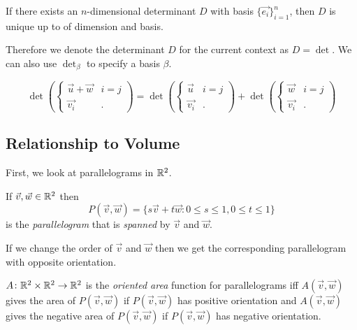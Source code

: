 \documentclass[notes.tex]{subfiles}
\begin{document}
\begin{lemma}
    If there exists an $n$-dimensional determinant $D$ with basis $\{ \vec{e_i} \}_{i = 1}^n$, then $D$ is unique up to of dimension and basis.
\end{lemma}

Therefore we denote the determinant $D$ for the current context as $D = \det$. We can also use $\det_\beta$ to specify a basis $\beta$.

\begin{theorem}
    \[
        \det\left( \begin{cases}
            \vec{u} + \vec{w} & i = j \\
            \vec{v_i} & .
        \end{cases} \right)
        =
        \det\left( \begin{cases}
            \vec{u} & i = j \\
            \vec{v_i} & .
        \end{cases} \right)
        +
        \det\left( \begin{cases}
            \vec{w} & i = j \\
            \vec{v_i} & .
        \end{cases} \right)
    \]
\end{theorem}

\subsection{Relationship to Volume}
First, we look at parallelograms in $\mathbb{R}^2$.

\begin{definition}[Parallelogram]
    If $\vec{v}, \vec{w} \in \mathbb{R}^2$ then
    \[
        P(\vec{v}, \vec{w}) = \{ s\vec{v} + t\vec{w} : 0 \leq s \leq 1, 0 \leq t \leq 1 \}
    \]
    is the \textit{parallelogram} that is \textit{spanned} by $\vec{v}$ and $\vec{w}$.
\end{definition}

If we change the order of $\vec{v}$ and $\vec{w}$ then we get the corresponding parallelogram with opposite orientation.

\begin{definition}
    $A\colon \mathbb{R}^2 \times \mathbb{R}^2 \to \mathbb{R}^2$ is the \textit{oriented area} function for parallelograms iff $A(\vec{v}, \vec{w})$ gives the area of $P(\vec{v}, \vec{w})$ if $P(\vec{v}, \vec{w})$ has positive orientation and $A(\vec{v}, \vec{w})$ gives the negative area of $P(\vec{v}, \vec{w})$ if $P(\vec{v}, \vec{w})$ has negative orientation.
\end{definition}
\end{document}
